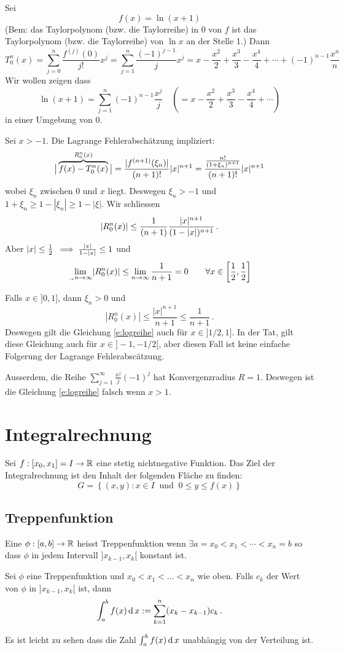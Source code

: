 \begin{Bsp} Sei
  \[f(x)=\ln(x+1)\]
  (Bem: das Taylorpolynom (bzw. die Taylorreihe) in 0 von $f$ ist 
das Taylorpolynom (bzw. die Taylorreihe) von $\ln x$ an der Stelle 1.)
Dann
  \[T^n_0(x)=\sum^n_{j=0}\frac{f^{(j)}(0)}{j!}x^j=
\sum^n_{j=1}\frac{(-1)^{j-1}}{j}x^j=x-\frac{x^2}{2}+\frac{x^3}{3}-\frac{x^4}{4}+\cdots
+ (-1)^{n-1} \frac{x^n}{n}\]
Wir wollen zeigen dass
\begin{equation}\label{e:logreihe}
\ln(x+1)= \sum_{j=1}^n (-1)^{n-1} \frac{x^j}{j}
\quad \left( = x-\frac{x^2}{2}+\frac{x^3}{3}-\frac{x^4}{4}+\cdots\right)
\end{equation}
in einer Umgebung von $0$.

Sei $x> -1$. Die Lagrange Fehlerabsch\"atzung impliziert: 
\[\big|\overbrace{f (x) -T_0^n(x)}^{R^n_0 (x)}\big|=
\frac{\mathopen| f^{(n+1)}(\xi_n) \mathclose|}{(n+1)!}\mathopen| x \mathclose|^{n+1}=
\frac{\frac{n!}{\left( 1+\xi_n \right)^{n+1}}}{(n+1)!}\mathopen| x \mathclose|^{n+1}\]
wobei $\xi_n$ zwischen 0 und $x$ liegt. Deswegen $\xi_n> -1$
und $1+\xi_n \geq 1-|\xi_n|\geq 1-|\xi|$.
Wir schliessen
\[|R^n_0 (x)|\leq \frac{1}{(n+1)}\frac{\mathopen| x \mathclose|^{n+1}}{(1-\mathopen| x \mathclose|)^{n+1}}\, .\]
Aber $\mathopen| x \mathclose|\leq \frac{1}{2}$ $\implies \frac{\mathopen| x \mathclose|}{1-\mathopen| x \mathclose|}\leq 1$
und
\[\displaystyle\lim_{_\rightarrow n\to\infty} \mathopen| R^n_0 (x) \mathclose|\leq\lim_{n\to\infty} \frac{1}{n+1} = 0
\qquad \forall x\in \left[\frac{1}{2}, \frac{1}{2} \right]\]

Falls $x\in ]0,1]$, dann $\xi_n>0$ und
\[|R^n_0 (x)| \leq \frac{|x|^{n+1}}{n+1} \leq \frac{1}{n+1}\, .\]
Deswegen gilt die Gleichung \eqref{e:logreihe} auch f\"ur $x\in ]1/2, 1]$.
In der Tat, gilt diese Gleichung auch f\"ur $x\in ]-1, -1/2[$, aber diesen
Fall ist keine einfache Folgerung der Lagrange Fehlerabsc\"atzung.

Ausserdem, die Reihe $\sum_{j=1}^\infty\frac{x^j}{j}(-1)^j$ 
hat Konvergenzradius $R=1$. Deswegen ist die Gleichung \eqref{e:logreihe}
falsch wenn $x>1$.
\end{Bsp}
\section{Integralrechnung}
Sei $f: [x_0, x_1]= I \to \mathbb{R}$ eine stetig nichtnegative Funktion.
Das Ziel der Integralrechnung ist den Inhalt der folgenden Fl\"ache zu finden: 
\[G=\left\{ (x,y): x\in I \;\;\mbox{und}\;\; 0\leq y \leq f(x) \right\}\]
\subsection{Treppenfunktion}
\begin{Def}
  Eine $\phi:[a,b]\to\mathbb{R}$ heisst Treppenfunktion wenn $\exists a=x_0<x_1<\cdots<x_n=b$ so dass $\phi$ in jedem Intervall $]x_{k-1},x_k[$ konstant ist.
\end{Def}
\begin{Def} Sei $\phi$ eine Treppenfunktion und $x_0<x_1< \ldots < x_n$ wie oben.
Falls $c_k$ der Wert von $\phi$ in $]x_{k-1}, x_k[$ ist, dann
\[\int^b_af(x)\operatorname{d} x:=\sum^n_{k=1} (x_k-x_{k-1})c_k\, .\]
\end{Def}
\begin{Bem} Es ist leicht zu sehen dass
die Zahl $\int^b_af(x)\operatorname{d} x$ unabhängig von der Verteilung ist.
\end{Bem}
